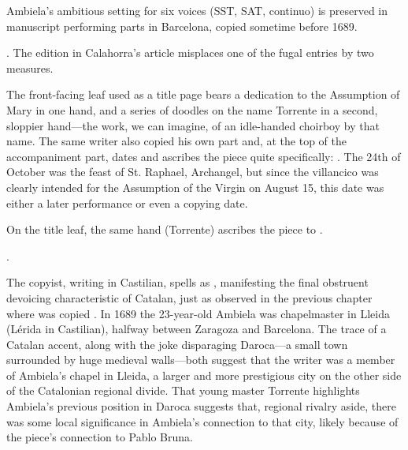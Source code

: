 Ambiela's ambitious setting for six voices (SST, SAT, continuo) is preserved in
manuscript performing parts in Barcelona, copied sometime before 1689.%
\begin{Footnote}
    .
    The edition in Calahorra's article misplaces one of the fugal entries by
    two measures. 
\end{Footnote}
The front-facing leaf used as a title page bears a dedication to the Assumption
of Mary in one hand, and a series of doodles on the name Torrente in a second,
sloppier hand---the work, we can imagine, of an idle-handed choirboy by that
name.
The same writer also copied his own  part and, at the top of the
accompaniment part, dates and ascribes the piece quite specifically:
.
The 24th of October was the feast of St. Raphael, Archangel, but since the
villancico was clearly intended for the Assumption of the Virgin on August 15,
this date was either a later performance or even a copying date.

On the title leaf, the same hand (Torrente) ascribes the piece to
.%
\begin{Footnote}
    .
\end{Footnote}
The copyist, writing in Castilian, spells  as ,
manifesting the final obstruent devoicing characteristic of Catalan, just as
observed in the previous chapter where  was copied
.  
In 1689 the 23-year-old Ambiela was chapelmaster in Lleida (Lérida in
Castilian), halfway between Zaragoza and Barcelona.
The trace of a Catalan accent, along with the joke disparaging Daroca---a small
town surrounded by huge medieval walls---both suggest that the writer was a
member of Ambiela's chapel in Lleida, a larger and more prestigious city on the
other side of the Catalonian regional divide.
That young master Torrente highlights Ambiela's previous position in Daroca
suggests that, regional rivalry aside, there was some local significance in
Ambiela's connection to that city, likely because of the piece's connection to
Pablo Bruna.

